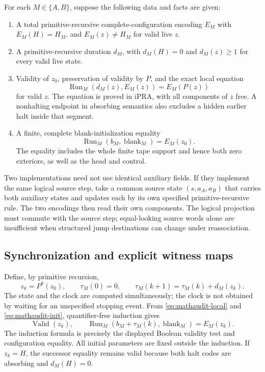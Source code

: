 For each $M\in\{A,B\}$, suppose the following data and facts are given:

\begin{enumerate}
\item A total primitive-recursive complete-configuration encoding $E_M$
with $E_M(H)=H_M$, and $E_M(z)\ne H_M$ for valid live $z$.
\item A primitive-recursive duration $d_M$, with $d_M(H)=0$ and
$d_M(z)\ge1$ for every valid live state.
\item Validity of $z_0$, preservation of validity by $P$, and the exact
local equation
\[
 \operatorname{Run}_M(d_M(z),E_M(z))=E_M(P(z))
 \tag{L}\label{eq:mathaudit-local}
\]
for valid $z$.  The equation is proved in iPRA, with all components of $z$
free.  A nonhalting endpoint in absorbing semantics also excludes a
hidden earlier halt inside that segment.
\item A finite, complete blank-initialization equality
\[
 \operatorname{Run}_M(b_M,\operatorname{blank}_M)=E_M(z_0).
 \tag{I}\label{eq:mathaudit-init}
\]
The equality includes the whole finite tape support and hence both zero
exteriors, as well as the head and control.
\end{enumerate}

Two implementations need not use identical auxiliary fields.  If they
implement the same logical source step, take a common source state
$(s,a_A,a_B)$ that carries both auxiliary states and updates each by its
own specified primitive-recursive rule.  The two encodings then read
their own components.  The logical projection must commute with the
source step; equal-looking source words alone are insufficient when
structured jump destinations can change under reassociation.

\subsection{Synchronization and explicit witness maps}

Define, by primitive recursion,
\[
 z_k=P^k(z_0),\qquad \tau_M(0)=0,\qquad
 \tau_M(k+1)=\tau_M(k)+d_M(z_k).
\]
The state and the clock are computed simultaneously; the clock is not
obtained by waiting for an unspecified stopping event.  From
\eqref{eq:mathaudit-local} and \eqref{eq:mathaudit-init}, quantifier-free
induction gives
\[
 \operatorname{Valid}(z_k),\qquad
 \operatorname{Run}_M(b_M+\tau_M(k),\operatorname{blank}_M)=E_M(z_k).
 \tag{S}\label{eq:mathaudit-sync}
\]
The induction formula is precisely the displayed Boolean validity test
and configuration equality.  All initial parameters are fixed outside
the induction.  If $z_k=H$, the successor equality remains valid because
both halt codes are absorbing and $d_M(H)=0$.

